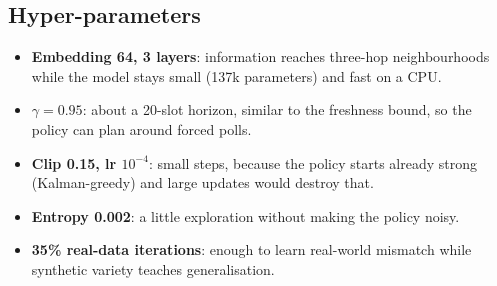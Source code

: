 \subsection{Hyper-parameters}
\begin{itemize}
  \item \textbf{Embedding 64, 3 layers}: information reaches three-hop neighbourhoods while the model stays small
        (137k parameters) and fast on a CPU.
  \item \textbf{$\gamma=0.95$}: about a 20-slot horizon, similar to the freshness bound, so the policy can plan around
        forced polls.
  \item \textbf{Clip 0.15, lr $10^{-4}$}: small steps, because the policy starts already strong (Kalman-greedy) and
        large updates would destroy that.
  \item \textbf{Entropy 0.002}: a little exploration without making the policy noisy.
  \item \textbf{35\% real-data iterations}: enough to learn real-world mismatch while synthetic variety teaches
        generalisation.
\end{itemize}
